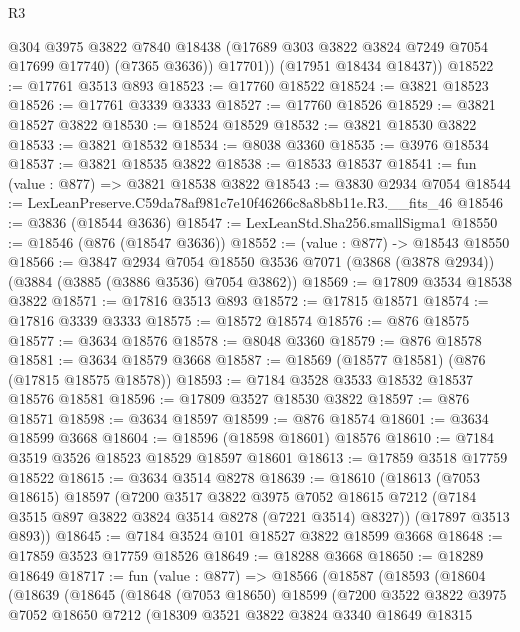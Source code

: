 \begin{lexlean}{R3}
\begin{coremodule}
            @304
            @3975
            @3822
            @7840
            @18438
            (@17689 @303 @3822 @3824 @7249 @7054 @17699 @17740)
            (@7365 @3636))
          @17701))
      (@17951 @18434 @18437))
@18522 := @17761 @3513 @893
@18523 := @17760 @18522
@18524 := @3821 @18523
@18526 := @17761 @3339 @3333
@18527 := @17760 @18526
@18529 := @3821 @18527 @3822
@18530 := @18524 @18529
@18532 := @3821 @18530 @3822
@18533 := @3821 @18532
@18534 := @8038 @3360
@18535 := @3976 @18534
@18537 := @3821 @18535 @3822
@18538 := @18533 @18537
@18541 := fun (value : @877) => @3821 @18538 @3822
@18543 := @3830 @2934 @7054
@18544 := LexLeanPreserve.C59da78af981c7e10f46266c8a8b8b11e.R3.__fits_46
@18546 := @3836 (@18544 @3636)
@18547 := LexLeanStd.Sha256.smallSigma1
@18550 := @18546 (@876 (@18547 @3636))
@18552 := (value : @877) -> @18543 @18550
@18566 := @3847
    @2934
    @7054
    @18550
    @3536
    @7071
    (@3868 (@3878 @2934))
    (@3884 (@3885 (@3886 @3536) @7054 @3862))
@18569 := @17809 @3534 @18538 @3822
@18571 := @17816 @3513 @893
@18572 := @17815 @18571
@18574 := @17816 @3339 @3333
@18575 := @18572 @18574
@18576 := @876 @18575
@18577 := @3634 @18576
@18578 := @8048 @3360
@18579 := @876 @18578
@18581 := @3634 @18579 @3668
@18587 := @18569 (@18577 @18581) (@876 (@17815 @18575 @18578))
@18593 := @7184 @3528 @3533 @18532 @18537 @18576 @18581
@18596 := @17809 @3527 @18530 @3822
@18597 := @876 @18571
@18598 := @3634 @18597
@18599 := @876 @18574
@18601 := @3634 @18599 @3668
@18604 := @18596 (@18598 @18601) @18576
@18610 := @7184 @3519 @3526 @18523 @18529 @18597 @18601
@18613 := @17859 @3518 @17759 @18522
@18615 := @3634 @3514 @8278
@18639 := @18610
    (@18613
      (@7053 @18615)
      @18597
      (@7200
        @3517
        @3822
        @3975
        @7052
        @18615
        @7212
        (@7184 @3515 @897 @3822 @3824 @3514 @8278 (@7221 @3514) @8327))
      (@17897 @3513 @893))
@18645 := @7184 @3524 @101 @18527 @3822 @18599 @3668
@18648 := @17859 @3523 @17759 @18526
@18649 := @18288 @3668
@18650 := @18289 @18649
@18717 := fun (value : @877) =>
  @18566
    (@18587
      (@18593
        (@18604
          (@18639
            (@18645
              (@18648
                (@7053 @18650)
                @18599
                (@7200
                  @3522
                  @3822
                  @3975
                  @7052
                  @18650
                  @7212
                  (@18309
                    @3521
                    @3822
                    @3824
                    @3340
                    @18649
                    @18315

\end{coremodule}
\end{lexlean}

